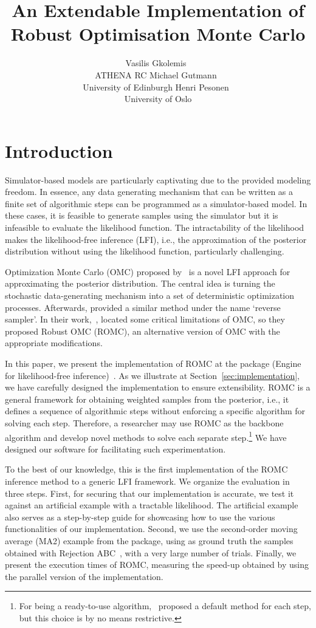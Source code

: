 \documentclass[article]{jss}
\author{Vasilis Gkolemis~\orcidlink{0000-0002-2636-0245}\\ATHENA RC \And
  Michael Gutmann~\orcidlink{0000-0002-5329-9910}\\University of Edinburgh \And
  Henri Pesonen~\orcidlink{0000-0003-4500-2926}\\University of Oslo}
\title{An Extendable \proglang{Python} Implementation of Robust Optimisation Monte Carlo}
\begin{document}
\section{Introduction} \label{sec:intro}

Simulator-based models are particularly captivating due to the
provided modeling freedom. In essence, any data generating mechanism
that can be written as a finite set of algorithmic steps can be
programmed as a simulator-based model. In these cases, it is feasible
to generate samples using the simulator but it is infeasible to
evaluate the likelihood function. The intractability of the likelihood
makes the likelihood-free inference (LFI), i.e., the approximation of
the posterior distribution without using the likelihood function,
particularly challenging.

Optimization Monte Carlo (OMC) proposed by~\citet{Meeds2015} is a
novel LFI approach for approximating the posterior distribution. The
central idea is turning the stochastic data-generating mechanism into
a set of deterministic optimization processes. Afterwards,
\citet{Forneron2016} provided a similar method under the name `reverse
sampler'. In their work,~\citet{Ikonomov2019}, located some critical
limitations of OMC, so they proposed Robust OMC (ROMC), an alternative
version of OMC with the appropriate modifications.

In this paper, we present the implementation of ROMC at the
 package  (Engine for likelihood-free
inference)~\citet{1708.00707}. As we illustrate at
Section~\ref{sec:implementation}, we have carefully designed the
implementation to ensure extensibility. ROMC is a general framework
for obtaining weighted samples from the posterior, i.e., it defines a
sequence of algorithmic steps without enforcing a specific algorithm
for solving each step. Therefore, a researcher may use ROMC as the
backbone algorithm and develop novel methods to solve each separate
step.\footnote{For being a ready-to-use
algorithm,~\citet{Ikonomov2019} proposed a default method for each
step, but this choice is by no means restrictive.} We have designed
our software for facilitating such experimentation.

To the best of our knowledge, this is the first implementation of the
ROMC inference method to a generic LFI framework. We organize the
evaluation in three steps. First, for securing that our implementation
is accurate, we test it against an artificial example with a tractable
likelihood. The artificial example also serves as a step-by-step guide
for showcasing how to use the various functionalities of our
implementation. Second, we use the second-order moving average (MA2)
example from the  package, using as ground truth the samples
obtained with Rejection ABC~\citet{lintusaari2017}, with a very large
number of trials. Finally, we present the execution times of ROMC,
measuring the speed-up obtained by using the parallel version of the
implementation.
\end{document}
